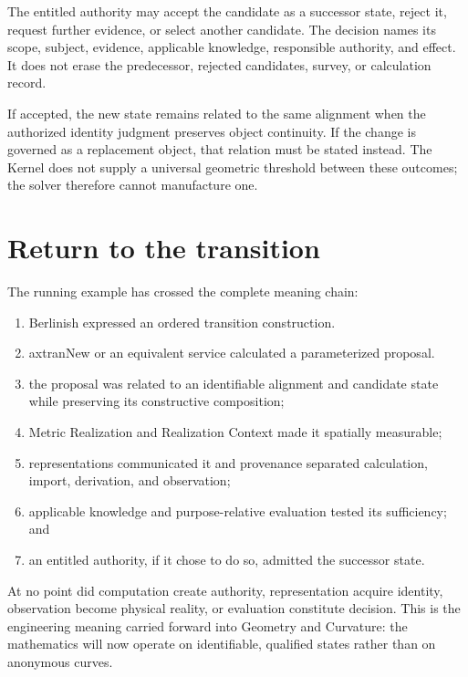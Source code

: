 The entitled authority may accept the candidate as a successor state, reject
it, request further evidence, or select another candidate. The decision names
its scope, subject, evidence, applicable knowledge, responsible authority, and
effect. It does not erase the predecessor, rejected candidates, survey, or
calculation record.

If accepted, the new state remains related to the same alignment when the
authorized identity judgment preserves object continuity. If the change is
governed as a replacement object, that relation must be stated instead. The
Kernel does not supply a universal geometric threshold between these outcomes;
the solver therefore cannot manufacture one.

\section{Return to the transition}

The running example has crossed the complete meaning chain:

\begin{enumerate}
\item Berlinish expressed an ordered transition construction.
\item axtranNew or an equivalent service calculated a parameterized proposal.
\item the proposal was related to an identifiable alignment and candidate
  state while preserving its constructive composition;
\item Metric Realization and Realization Context made it spatially measurable;
\item representations communicated it and provenance separated calculation,
  import, derivation, and observation;
\item applicable knowledge and purpose-relative evaluation tested its
  sufficiency; and
\item an entitled authority, if it chose to do so, admitted the successor
  state.
\end{enumerate}

At no point did computation create authority, representation acquire identity,
observation become physical reality, or evaluation constitute decision. This
is the engineering meaning carried forward into Geometry and Curvature: the
mathematics will now operate on identifiable, qualified states rather than on
anonymous curves.
